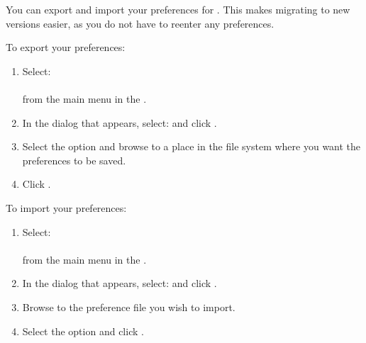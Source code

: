 You can export and import your \gddb{} preferences for \app{}. This makes migrating to new versions easier, as you do not have to reenter any \gddb{} preferences. 

To export your \gddb{} preferences:
\begin{enumerate}
\item Select: \\
\\
from the main menu in the \ite{}. 
\item In the dialog that appears, select:  and click .
\item Select the  option and browse to a place in the file system where you want the preferences to be saved. 
\item Click .
\end{enumerate}

To import your \gddb{} preferences:
\begin{enumerate}
\item Select: \\
\\
from the main menu in the \ite{}. 
\item In the dialog that appears, select:  and click .
\item Browse to the preference file you wish to import. 
\item Select the  option and click .
\end{enumerate}
